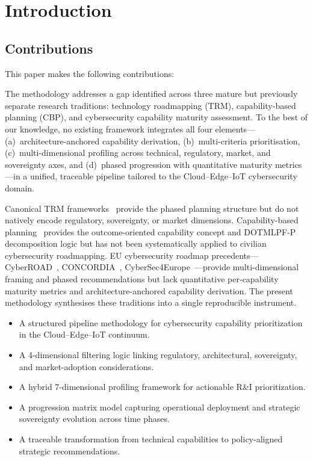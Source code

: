 \section{Introduction}

\subsection{Contributions}

This paper makes the following contributions:

The
methodology addresses a gap identified across three mature but previously
separate research traditions: technology roadmapping (TRM),
capability-based planning (CBP), and cybersecurity capability maturity
assessment. To the best of our knowledge, no existing framework integrates
all four elements---(a)~architecture-anchored capability derivation,
(b)~multi-criteria prioritisation, (c)~multi-dimensional profiling across
technical, regulatory, market, and sovereignty axes, and (d)~phased
progression with quantitative maturity metrics---in a unified, traceable
pipeline tailored to the Cloud--Edge--IoT cybersecurity domain.

Canonical TRM frameworks~\cite{phaal2004,garcia1997} provide the phased
planning structure but do not natively encode regulatory, sovereignty, or
market dimensions. Capability-based planning~\cite{davis2002} provides the
outcome-oriented capability concept and DOTMLPF-P decomposition logic but
has not been systematically applied to civilian cybersecurity roadmapping.
EU cybersecurity roadmap precedents---CyberROAD~\cite{ariu2016},
CONCORDIA~\cite{concordia}, CyberSec4Europe~\cite{cybersec4europe_d45}---provide
multi-dimensional framing and phased recommendations but lack quantitative
per-capability maturity metrics and architecture-anchored capability
derivation. The present methodology synthesises these traditions into a
single reproducible instrument.

\begin{itemize}
    \item A structured pipeline methodology for cybersecurity capability prioritization in the Cloud--Edge--IoT continuum.
    \item A 4-dimensional filtering logic linking regulatory, architectural, sovereignty, and market-adoption considerations.
    \item A hybrid 7-dimensional profiling framework for actionable R\&I prioritization.
    \item A progression matrix model capturing operational deployment and strategic sovereignty evolution across time phases.
    \item A traceable transformation from technical capabilities to policy-aligned strategic recommendations.
\end{itemize}
\newpage

